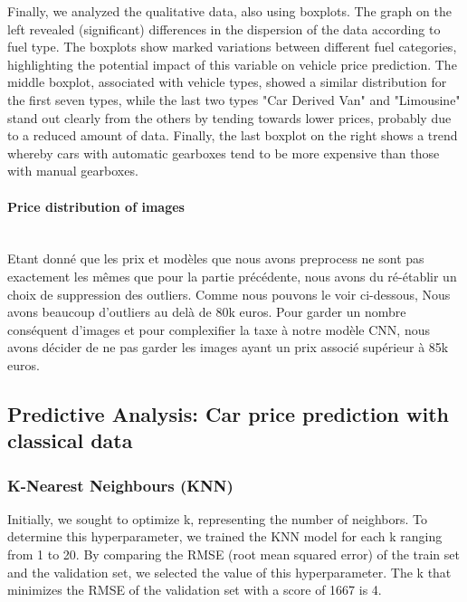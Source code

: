 \documentclass[12pt]{article}
\begin{document}
\noindent Finally, we analyzed the qualitative data, also using boxplots. The graph on the left revealed (significant) differences in the dispersion of the data according to fuel type. The boxplots show marked variations between different fuel categories, highlighting the potential impact of this variable on vehicle price prediction. 
The middle boxplot, associated with vehicle types, showed a similar distribution for the first seven types, while the last two types "Car Derived Van" and "Limousine" stand out clearly from the others by tending towards lower prices, probably due to a reduced amount of data. 
Finally, the last boxplot on the right shows a trend whereby cars with automatic gearboxes tend to be more expensive than those with manual gearboxes.




\paragraph{Price distribution of images}
~~\\
\noindent Etant donné que les prix et modèles que nous avons preprocess ne sont pas exactement les mêmes que pour la partie précédente, nous avons du ré-établir un choix de suppression des outliers. Comme nous pouvons le voir ci-dessous, Nous avons beaucoup d'outliers au delà de 80k euros. Pour garder un nombre conséquent d'images et pour complexifier la taxe à notre modèle CNN, nous avons décider de ne pas garder les images ayant un prix associé supérieur à 85k euros.











\subsection{Predictive Analysis: Car price prediction with classical data}

\subsubsection{K-Nearest Neighbours (KNN)}

Initially, we sought to optimize k, representing the number of neighbors. To determine this hyperparameter, we trained the KNN model for each k ranging from 1 to 20. By comparing the RMSE (root mean squared error) of the train set and the validation set, we selected the value of this hyperparameter. The k that minimizes the RMSE of the validation set with a score of 1667 is 4. 
\end{document}
